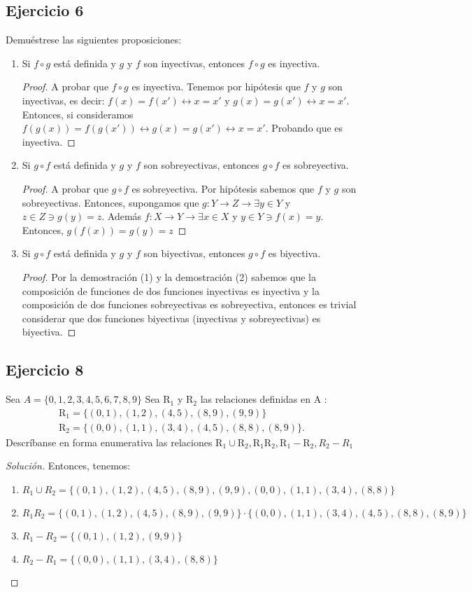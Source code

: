 \documentclass[a4paper,12pt]{article}
\newenvironment{solution}
  {\renewcommand\qedsymbol{$\blacksquare$}\begin{proof}[Solución]}
  {\end{proof}}
\begin{document}
\subsection{Ejercicio 6}
Demuéstrese las siguientes proposiciones: 
\begin{enumerate}
    \item Si $f\circ g$ está definida y $g$ y $f$ son inyectivas, entonces $f\circ g$ es inyectiva.
    \begin{proof}
    A probar que $f\circ g$ es inyectiva. Tenemos por hipótesis que $f$ y $g$ son inyectivas, es decir: $f(x)=f(x') \leftrightarrow x=x'$ y $g(x)=g(x') \leftrightarrow x=x'$. Entonces, si consideramos $f(g(x))=f(g(x'))\leftrightarrow g(x)=g(x')\leftrightarrow x=x'$. Probando que es inyectiva. 
    \end{proof}
    \item Si $g\circ f$ está definida y $g$ y $f$ son sobreyectivas, entonces $g\circ f$ es sobreyectiva.
    \begin{proof}
    A probar que $g\circ f$ es sobreyectiva. Por hipótesis sabemos que $f$ y $g$ son sobreyectivas. Entonces, supongamos que $g: Y\to Z\to \exists y\in Y$ y $z\in Z\ni g(y)=z$. Además $f: X\to Y\to \exists x\in X $ y $y\in Y\ni f(x)= y$. Entonces, $g(f(x))=g(y)=z$
    \end{proof}
    \item Si $g\circ f$ está definida y $g$ y $f$ son biyectivas, entonces $g\circ f$ es biyectiva.
    \begin{proof}
    Por la demostración (1) y la demostración (2) sabemos que la composición de funciones de dos funciones inyectivas es inyectiva y la composición de dos funciones sobreyectivas es sobreyectiva, entonces es trivial considerar que dos funciones biyectivas (inyectivas y sobreyectivas) es biyectiva. 
    \end{proof}
\end{enumerate}
\subsection{Ejercicio 8}
Sea $A=\{0,1,2,3,4,5,6,7,8,9\}$
Sea $\mathrm{R}_{1}$ y $\mathrm{R}_{2}$ las relaciones definidas en $\mathrm{A}$ :
$$
\begin{array}{l}
\mathrm{R}_{1}=\{(0,1),(1,2),(4,5),(8,9),(9,9)\} \\
\mathrm{R}_{2}=\{(0,0),(1,1),(3,4),(4,5),(8,8),(8,9)\} .
\end{array}
$$
Descríbanse en forma enumerativa las relaciones $\mathrm{R}_{1} \cup \mathrm{R}_{2}, \mathrm{R}_{1} \mathrm{R}_{2}, \mathrm{R}_{1}-\mathrm{R}_{2}, R_{2}-R_{1}
$
\begin{solution}
Entonces, tenemos:
\begin{enumerate}
    \item $R_1\cup R_2=\{(0,1),(1,2),(4,5),(8,9),(9,9),(0,0),(1,1),(3,4),(8,8)\}$
    \item $R_1R_2 =\{(0,1),(1,2),(4,5),(8,9),(9,9)\}\cdot\{(0,0),(1,1),(3,4),(4,5),(8,8),(8,9)\}$
    \item $R_1-R_2 =\{(0,1),(1,2),(9,9)\}$
    \item $R_2-R_1= \{(0,0),(1,1),(3,4),(8,8)\}$
\end{enumerate}
\end{solution}
\end{document}
